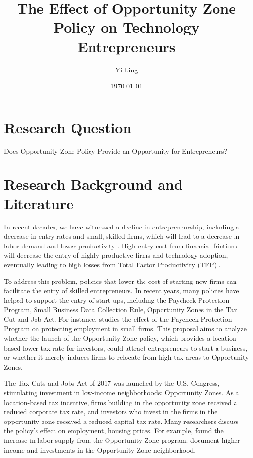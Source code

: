 



\title{\Large \textbf{The Effect of Opportunity Zone Policy on Technology Entrepreneurs}}
\author{Yi Ling}

\date{\today}

\maketitle

\thispagestyle{empty} 
\doublespacing
\thispagestyle{empty} 

\section{Research Question}
Does Opportunity Zone Policy Provide an Opportunity for Entrepreneurs?

\section{Research Background and Literature}
In recent decades, we have witnessed a decline in entrepreneurship, including a decrease in entry rates and small, skilled firms, which will lead to a decrease in labor demand and lower productivity \citep{jiangSkillbiasedEntrepreneurialDecline2023}. High entry cost from financial frictions will decrease the entry of highly productive firms and technology adoption, eventually leading to high losses from Total Factor Productivity (TFP) \citep{midrigan2014finance}. 

To address this problem, policies that lower the cost of starting new firms can facilitate the entry of skilled entrepreneurs.  In recent years, many policies have helped to support the entry of start-ups, including the Paycheck Protection Program, Small Business Data Collection Rule, Opportunity Zones in the Tax Cut and Job Act. For instance, \cite{hubbard2020has} studies the effect of the Paycheck Protection Program on protecting employment in small firms. This proposal aims to analyze whether the launch of the Opportunity Zone policy, which provides a location-based lower tax rate for investors, could attract entrepreneurs to start a business, or whether it merely induces firms to relocate from high-tax areas to Opportunity Zones.

The Tax Cuts and Jobs Act of 2017 was launched by the U.S. Congress, stimulating investment in low-income neighborhoods: Opportunity Zones. As a location-based tax incentive, firms building in the opportunity zone received a reduced corporate tax rate, and investors who invest in the firms in the opportunity zone received a reduced capital tax rate. Many researchers discuss the policy's effect on employment, housing prices. For example, \cite{arefeva2020benefits} found the increase in labor supply from the Opportunity Zone program. \cite{kennedy2021neighborhood} document higher income and investments in the Opportunity Zone neighborhood.

